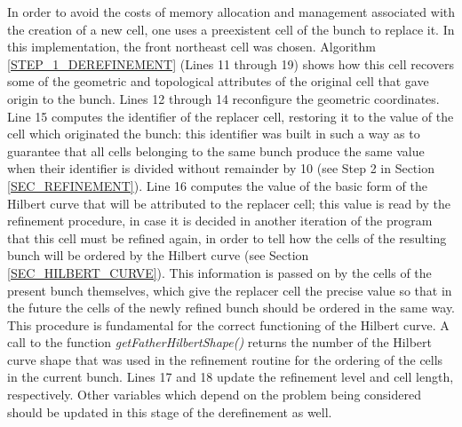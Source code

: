 In order to avoid the costs of memory allocation and management
associated with the creation of a new cell, one uses a preexistent
cell of the bunch to replace it. In this implementation, the front
northeast cell was chosen. Algorithm \ref{STEP_1_DEREFINEMENT}
(Lines 11 through 19) shows how this cell recovers some of the
geometric and topological attributes of the original cell that gave
origin to the bunch. Lines 12 through 14 reconfigure the geometric
coordinates. Line 15 computes the identifier of the replacer cell,
restoring it to the value of the cell which originated the bunch:
this identifier was built in such a way as to guarantee that all
cells belonging to the same bunch produce the same value when their
identifier is divided without remainder by 10 (see Step 2 in Section
\ref{SEC_REFINEMENT}). Line 16 computes the value of the basic form
of the Hilbert curve that will be attributed to the replacer cell;
this value is read by the refinement procedure, in case it is
decided in another iteration of the program that this cell must be
refined again, in order to tell how the cells of the resulting bunch
will be ordered by the Hilbert curve (see Section
\ref{SEC_HILBERT_CURVE}). This information is passed on by the cells
of the present bunch themselves, which give the replacer cell the
precise value so that in the future the cells of the newly refined
bunch should be ordered in the same way. This procedure is
fundamental for the correct functioning of the Hilbert curve. A call
to the function \textit{getFatherHilbertShape()} returns the number
of the Hilbert curve shape that was used in the refinement routine
for the ordering of the cells in the current bunch. Lines 17 and 18
update the refinement level and cell length, respectively. Other
variables which depend on the problem being considered should be
updated in this stage of the derefinement as well.

